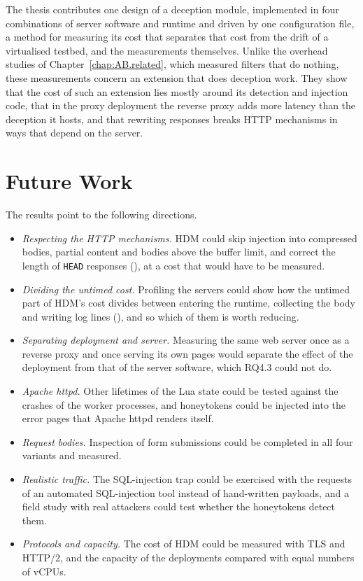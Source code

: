 \documentclass{rptuma}
\begin{document}
The thesis contributes one design of a deception module, implemented in four combinations of
server software and runtime and driven by one configuration file, a method for measuring its cost that separates that cost from the drift of a virtualised testbed, and
the measurements themselves. Unlike the overhead studies of Chapter~\ref{chap:AB.related}, which
measured filters that do nothing, these measurements concern an extension that does deception work.
They show that the cost of such an extension lies mostly around its detection and injection code, that
in the proxy deployment the reverse proxy adds more latency than the deception it hosts, and that rewriting
responses breaks HTTP mechanisms in ways that depend on the server.

\section{Future Work}
\label{sec:concl.future}

The results point to the following directions.
\begin{itemize}
  \item \emph{Respecting the HTTP mechanisms.} HDM could skip injection into compressed bodies,
    partial content and bodies above the buffer limit, and correct the length of \texttt{HEAD}
    responses (), at a cost that would have to be measured.
  \item \emph{Dividing the untimed cost.} Profiling the servers could show how the untimed part of
    HDM's cost divides between entering the runtime, collecting the body and writing log lines
    (), and so which of them is worth reducing.
  \item \emph{Separating deployment and server.} Measuring the same web server once as a reverse
    proxy and once serving its own pages would separate the effect of the deployment from that of
    the server software, which RQ4.3 could not do.
  \item \emph{Apache httpd.} Other lifetimes of the Lua state could be tested against the crashes of
    the worker processes, and honeytokens could be injected into the error pages that Apache httpd
    renders itself.
  \item \emph{Request bodies.} Inspection of form submissions could be completed in all four variants
    and measured.
  \item \emph{Realistic traffic.} The SQL-injection trap could be exercised with the requests of an
    automated SQL-injection tool instead of hand-written payloads, and a field study with real
    attackers could test whether the honeytokens detect them.
  \item \emph{Protocols and capacity.} The cost of HDM could be measured with TLS and HTTP/2, and the
    capacity of the deployments compared with equal numbers of vCPUs.
\end{itemize}
\end{document}
